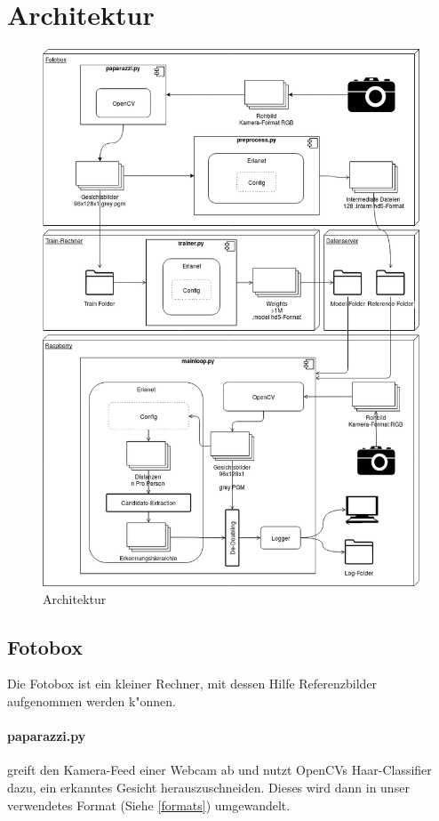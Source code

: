 \documentclass[12pt]{article}
\begin{document}
\section{Architektur}
\afterpage{\clearpage}
\begin{figure}[H]
    \includegraphics[height=0.9\textheight]{Architektur}
    \caption{Architektur}
\end{figure}

\subsection{Fotobox}
Die Fotobox ist ein kleiner Rechner,
mit dessen Hilfe Referenzbilder aufgenommen werden
k"onnen.
\paragraph{paparazzi.py}
greift den Kamera-Feed einer Webcam ab und nutzt
OpenCVs Haar-Classifier dazu, ein erkanntes Gesicht 
herauszuschneiden. Dieses wird dann in unser verwendetes
Format (Siehe \ref{formats}) umgewandelt.
\end{document}
